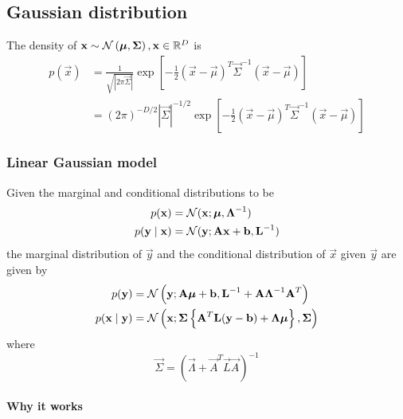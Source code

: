 \subsection{Gaussian distribution}
The density of $\boldsymbol{\mathbf{x}} \sim \operatorname{\mathcal N}\left(\boldsymbol{\mathbf{\mu}}, \boldsymbol{\mathbf{\Sigma}}\right), \boldsymbol{\mathbf{x}} \in \mathbb R^D$ is
\begin{align}
    p(\vec x)   &= \frac{1}{\sqrt{|2\pi\vec \Sigma|}} \exp{\left[-\frac{1}{2}(\vec x - \vec \mu)^T \vec \Sigma^{-1} (\vec x - \vec \mu)\right]} \\
                &= (2\pi)^{-D / 2} |\vec \Sigma|^{-1 / 2} \exp{\left[-\frac{1}{2}(\vec x - \vec \mu)^T \vec \Sigma^{-1} (\vec x - \vec \mu)\right]}
\end{align}
\subsubsection{Linear Gaussian model}
\label{ssec:prob-gaussian-lingauss}
Given the marginal and conditional distributions to be
\begin{align}
    p(\boldsymbol{\mathbf{x}})               &= \operatorname{\mathcal N}(\boldsymbol{\mathbf{x}}; \boldsymbol{\mathbf{\mu}}, \boldsymbol{\mathbf{\Lambda}}^{-1}) \label{eqn:prob-gaussian-lingauss1} \\
    p(\boldsymbol{\mathbf{y}} \mid \boldsymbol{\mathbf{x}})   &= \operatorname{\mathcal N}(\boldsymbol{\mathbf{y}}; \boldsymbol{\mathbf{A}} \boldsymbol{\mathbf{x}} + \boldsymbol{\mathbf{b}}, \boldsymbol{\mathbf{L}}^{-1}) \label{eqn:prob-gaussian-lingauss2}
\end{align}
the marginal distribution of $\vec y$ and the conditional distribution of $\vec x$ given $\vec y$ are given by
\begin{align}
    p(\boldsymbol{\mathbf{y}})               &= \operatorname{\mathcal N}\left(\boldsymbol{\mathbf{y}}; \boldsymbol{\mathbf{A}} \boldsymbol{\mathbf{\mu}} + \boldsymbol{\mathbf{b}}, \boldsymbol{\mathbf{L}}^{-1} + \boldsymbol{\mathbf{A}} \boldsymbol{\mathbf{\Lambda}}^{-1} \boldsymbol{\mathbf{A}}^T\right) \label{eqn:prob-gaussian-lingauss3}\\
    p(\boldsymbol{\mathbf{x}} \mid \boldsymbol{\mathbf{y}})   &= \operatorname{\mathcal N}\left(\boldsymbol{\mathbf{x}}; \boldsymbol{\mathbf{\Sigma}}\left\{\boldsymbol{\mathbf{A}}^T \boldsymbol{\mathbf{L}}(\boldsymbol{\mathbf{y}} - \boldsymbol{\mathbf{b}}) + \boldsymbol{\mathbf{\Lambda}} \boldsymbol{\mathbf{\mu}}\right\}, \boldsymbol{\mathbf{\Sigma}}\right) \label{eqn:prob-gaussian-lingauss4}
\end{align}
where
\begin{equation}
    \vec \Sigma = \left(\vec \Lambda + \vec A^T \vec L \vec A \right)^{-1} \label{eqn:prob-gaussian-lingauss5}
\end{equation}

\paragraph{Why it works}